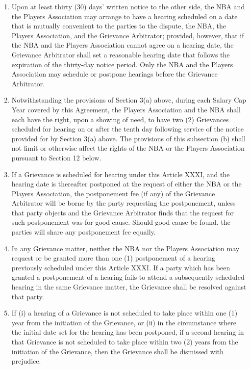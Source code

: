 \documentclass[
]{book}
\providecommand{\tightlist}{%
  \setlength{\itemsep}{0pt}\setlength{\parskip}{0pt}}
\begin{document}
\begin{enumerate}
\def\labelenumi{(\alph{enumi})}
\tightlist
\item
  Upon at least thirty (30) days' written notice to the other side, the NBA and the Players Association may arrange to have a hearing scheduled on a date that is mutually convenient to the parties to the dispute, the NBA, the Players Association, and the Grievance Arbitrator; provided, however, that if the NBA and the Players Association cannot agree on a hearing date, the Grievance Arbitrator shall set a reasonable hearing date that follows the expiration of the thirty-day notice period. Only the NBA and the Players Association may schedule or postpone hearings before the Grievance Arbitrator.
\item
  Notwithstanding the provisions of Section 3(a) above, during each Salary Cap Year covered by this Agreement, the Players Association and the NBA shall each have the right, upon a showing of need, to have two (2) Grievances scheduled for hearing on or after the tenth day following service of the notice provided for by Section 3(a) above. The provisions of this subsection (b) shall not limit or otherwise affect the rights of the NBA or the Players Association pursuant to Section 12 below.
\item
  If a Grievance is scheduled for hearing under this Article XXXI, and the hearing date is thereafter postponed at the request of either the NBA or the Players Association, the postponement fee (if any) of the Grievance Arbitrator will be borne by the party requesting the postponement, unless that party objects and the Grievance Arbitrator finds that the request for such postponement was for good cause. Should good cause be found, the parties will share any postponement fee equally.
\item
  In any Grievance matter, neither the NBA nor the Players Association may request or be granted more than one (1) postponement of a hearing previously scheduled under this Article XXXI. If a party which has been granted a postponement of a hearing fails to attend a subsequently scheduled hearing in the same Grievance matter, the Grievance shall be resolved against that party.
\item
  If (i) a hearing of a Grievance is not scheduled to take place within one (1) year from the initiation of the Grievance, or (ii) in the circumstance where the initial date set for the hearing has been postponed, if a second hearing in that Grievance is not scheduled to take place within two (2) years from the initiation of the Grievance, then the Grievance shall be dismissed with prejudice.

\end{enumerate}
\end{document}
